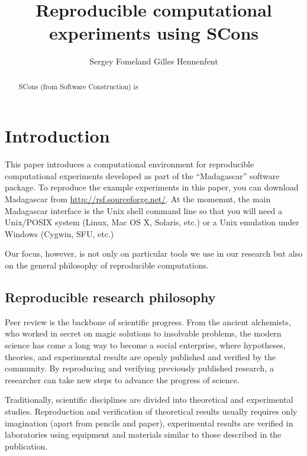 \title{Reproducible computational experiments using SCons}


\author{Sergey Fomel\/\footnotemark[1] and Gilles Hennenfent\/\footnotemark[2]}


\maketitle

\begin{abstract}
SCons (from Software Construction) is
\end{abstract}

\section{Introduction}

This paper introduces a computational environment for reproducible
computational experiments developed as part of the ``Madagascar''
software package. To reproduce the example experiments in this paper,
you can download Madagascar from \url{http://rsf.sourceforge.net/}. At
the momemnt, the main Madagascar interface is the Unix shell command
line so that you will need a Unix/POSIX system (Linux, Mac OS X,
Solaris, etc.) or a Unix emulation under Windows (Cygwin, SFU, etc.)

Our focus, however, is not only on particular
tools we use in our research but also on the general philosophy of
reproducible computations.

\subsection{Reproducible research philosophy}

Peer review is the backbone of scientific progress. From the ancient
alchemists, who worked in secret on magic solutions to insolvable
problems, the modern science has come a long way to become a social
enterprise, where hypotheses, theories, and experimental results are
openly published and verified by the community. By reproducing and
verifying previously published research, a researcher can take new
steps to advance the progress of science.

Traditionally, scientific disciplines are divided into theoretical and
experimental studies. Reproduction and verification of theoretical
results usually requires only imagination (apart from pencils and
paper), experimental results are verified in laboratories using
equipment and materials similar to those described in the publication.

